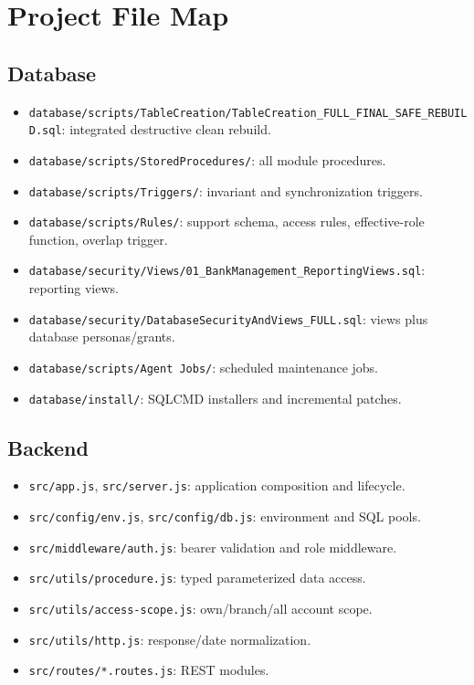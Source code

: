 \documentclass[11pt,a4paper,oneside]{report}
\newcommand{\codepath}[1]{\nolinkurl{#1}}
\begin{document}
\appendix
\chapter{Project File Map}
\section{Database}
\begin{itemize}
\item \codepath{database/scripts/TableCreation/TableCreation_FULL_FINAL_SAFE_REBUILD.sql}: integrated destructive clean rebuild.
\item \codepath{database/scripts/StoredProcedures/}: all module procedures.
\item \codepath{database/scripts/Triggers/}: invariant and synchronization triggers.
\item \codepath{database/scripts/Rules/}: support schema, access rules, effective-role function, overlap trigger.
\item \codepath{database/security/Views/01_BankManagement_ReportingViews.sql}: reporting views.
\item \codepath{database/security/DatabaseSecurityAndViews_FULL.sql}: views plus database personas/grants.
\item \codepath{database/scripts/Agent Jobs/}: scheduled maintenance jobs.
\item \codepath{database/install/}: SQLCMD installers and incremental patches.
\end{itemize}
\section{Backend}
\begin{itemize}
\item \codepath{src/app.js}, \codepath{src/server.js}: application composition and lifecycle.
\item \codepath{src/config/env.js}, \codepath{src/config/db.js}: environment and SQL pools.
\item \codepath{src/middleware/auth.js}: bearer validation and role middleware.
\item \codepath{src/utils/procedure.js}: typed parameterized data access.
\item \codepath{src/utils/access-scope.js}: own/branch/all account scope.
\item \codepath{src/utils/http.js}: response/date normalization.
\item \codepath{src/routes/*.routes.js}: REST modules.
\end{itemize}
\end{document}
